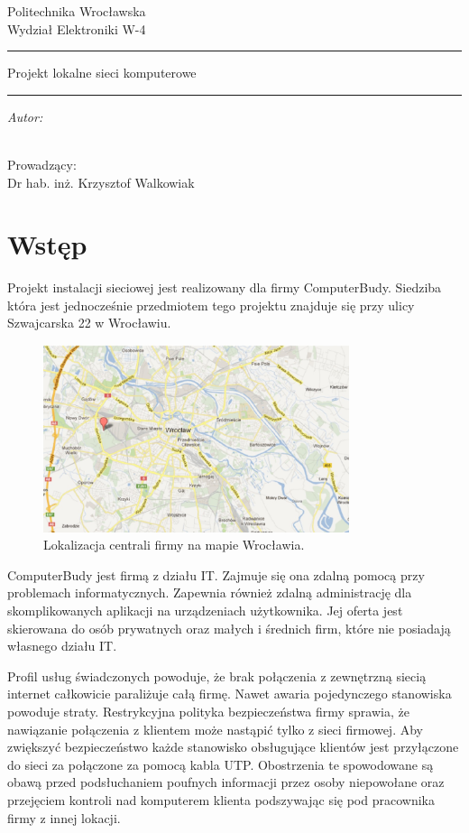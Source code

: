 \documentclass{report}
\author{Mateusz Socha 181308 \\ Janusz Kuszczyński 184872 }
\title{}
\makeatletter
\newcommand{\linia}{\rule{\linewidth}{0.4mm}}
\renewcommand{\maketitle}{\begin{titlepage}

    \vspace*{1cm}

    \begin{center}\small

    Politechnika Wrocławska\\

    Wydział Elektroniki W-4\\

    \end{center}

    \vspace{3cm}

    \noindent\linia

    \begin{center}

      \LARGE Projekt lokalne sieci komputerowe\\
      \normalsize\textsc{\@title}

         \end{center}

     \noindent\linia

    \vspace{0.5cm}

    \begin{flushright}

    \begin{minipage}{6cm}

    \textit{\small Autor:}\\

    \normalsize \textsc{\@author} \\

    \end{minipage}

    \vspace{5cm}

     {\small Prowadzący:}\\

         Dr hab. inż. Krzysztof Walkowiak

     \end{flushright}

    \vspace*{\stretch{6}}

    \begin{center}

    \@date

    \end{center}

  \end{titlepage}

}
\makeatother
\begin{document}
\maketitle
\tableofcontents

\chapter{Wstęp}

\vspace{0,5cm}
Projekt instalacji sieciowej jest realizowany dla firmy ComputerBudy. Siedziba która jest jednocześnie przedmiotem tego projektu znajduje się
przy ulicy Szwajcarska 22 w Wrocławiu.

\begin{figure}[H]
  \centering
      \includegraphics[width=0.8\textwidth]{./obrazki/adres_computerbudy.jpeg}
  \caption{Lokalizacja centrali firmy na mapie Wrocławia.}
\end{figure}

ComputerBudy jest firmą z działu IT. Zajmuje się ona zdalną pomocą przy problemach informatycznych. Zapewnia również zdalną administrację dla
skomplikowanych aplikacji na urządzeniach użytkownika. Jej oferta jest skierowana do osób prywatnych oraz małych i średnich firm, które
nie posiadają własnego działu IT.

Profil usług świadczonych powoduje, że brak połączenia z zewnętrzną siecią internet całkowicie paraliżuje całą firmę. 
Nawet awaria pojedynczego stanowiska powoduje straty. Restrykcyjna polityka bezpieczeństwa firmy sprawia, że nawiązanie połączenia z klientem
może nastąpić tylko z sieci firmowej. Aby zwiększyć bezpieczeństwo każde stanowisko obsługujące klientów jest przyłączone do sieci
za połączone za pomocą kabla UTP. Obostrzenia te spowodowane są obawą przed podsłuchaniem poufnych informacji przez osoby niepowołane oraz
przejęciem kontroli nad komputerem klienta podszywając się pod pracownika firmy z innej lokacji.
\end{document}

